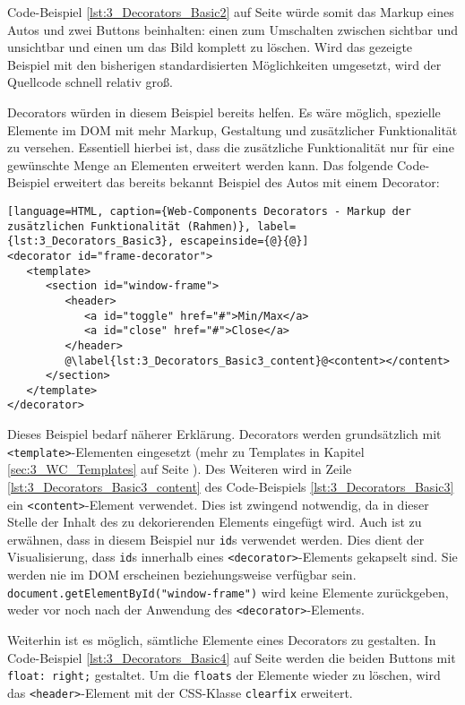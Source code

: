 Code-Beispiel \ref{lst:3_Decorators_Basic2} auf Seite \pageref{lst:3_Decorators_Basic2} würde somit das Markup eines Autos und zwei Buttons beinhalten: einen zum Umschalten zwischen sichtbar und unsichtbar und einen um das Bild komplett zu löschen.
Wird das gezeigte Beispiel mit den bisherigen standardisierten Möglichkeiten umgesetzt, wird der Quellcode schnell relativ groß.

Decorators würden in diesem Beispiel bereits helfen. Es wäre möglich, spezielle Elemente im DOM mit mehr Markup, Gestaltung und zusätzlicher Funktionalität zu versehen. Essentiell hierbei ist, dass die zusätzliche Funktionalität nur für eine gewünschte Menge an Elementen erweitert werden kann. Das folgende Code-Beispiel erweitert das bereits bekannt Beispiel des Autos mit einem Decorator:

\begin{lstlisting}[language=HTML, caption={Web-Components Decorators - Markup der zusätzlichen Funktionalität (Rahmen)}, label={lst:3_Decorators_Basic3}, escapeinside={@}{@}]
<decorator id="frame-decorator">
   <template>
      <section id="window-frame">
         <header>
            <a id="toggle" href="#">Min/Max</a>
            <a id="close" href="#">Close</a>
         </header>
         @\label{lst:3_Decorators_Basic3_content}@<content></content>
      </section>
   </template>
</decorator>
\end{lstlisting}

Dieses Beispiel bedarf näherer Erklärung. Decorators werden grundsätzlich mit \lstinline|<template>|-Elementen eingesetzt (mehr zu Templates in Kapitel \ref{sec:3_WC_Templates} auf Seite \pageref{sec:3_WC_Templates}). Des Weiteren wird in Zeile \ref{lst:3_Decorators_Basic3_content} des Code-Beispiels \ref{lst:3_Decorators_Basic3} ein \lstinline|<content>|-Element verwendet. Dies ist zwingend notwendig, da in dieser Stelle der Inhalt des zu dekorierenden Elements eingefügt wird. Auch ist zu erwähnen, dass in diesem Beispiel nur \lstinline|id|s verwendet werden. Dies dient der Visualisierung, dass \lstinline|id|s innerhalb eines \lstinline|<decorator>|-Elements gekapselt sind. Sie werden nie im DOM erscheinen beziehungsweise verfügbar sein. \lstinline|document.getElementById("window-frame")| wird keine Elemente zurückgeben, weder vor noch nach der Anwendung des \lstinline|<decorator>|-Elements.

Weiterhin ist es möglich, sämtliche Elemente eines Decorators zu gestalten. In Code-Beispiel \ref{lst:3_Decorators_Basic4} auf Seite \pageref{lst:3_Decorators_Basic4} werden die beiden Buttons mit \lstinline|float: right;| gestaltet. Um die \lstinline|floats| der Elemente wieder zu löschen, wird das \lstinline|<header>|-Element mit der CSS-Klasse \lstinline|clearfix| erweitert.

